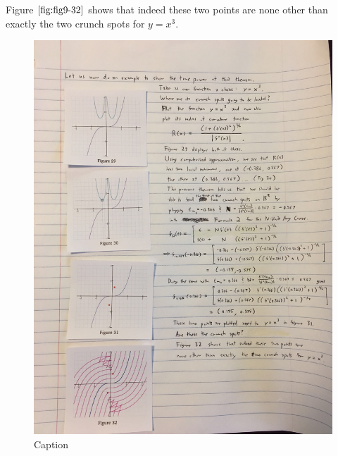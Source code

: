 Figure $\ref{fig:fig9-32}$ shows that indeed these two points are none other than exactly the two crunch spots for $y = x^3$.

\begin{figure}[H] %
    \begin{minipage}[b]{0.2\linewidth}
        \centering
        \includegraphics[height=0.1\textheight]{findig-crunch-spots-img/Fig 9-29.png}
        \caption{Caption}
        \label{fig:fig9-29}
    \end{minipage}
    \begin{minipage}[b]{0.2\linewidth}
        \centering

\end{minipage}
\end{figure}
